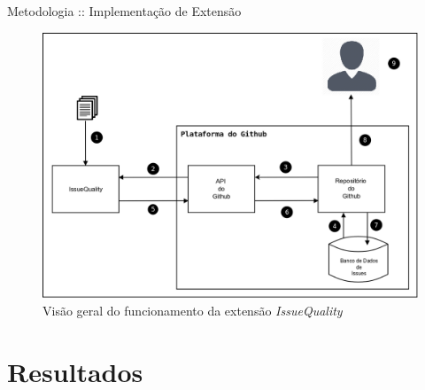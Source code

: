 \documentclass[t,14pt,mathserif]{beamer}
\begin{document}
\begin{frame}{Metodologia :: Implementação de Extensão}

    \begin{figure}[htpb]
        \centering
        \includegraphics[width=0.7\linewidth]{../img/diagrama_funcionamento_issuequality.png}
        \caption{Visão geral do funcionamento da extensão \textit{IssueQuality}}
\label{fig:diagrama_funcionamento_issuequality}
    \end{figure}
\end{frame}

\section{Resultados}
\end{document}
